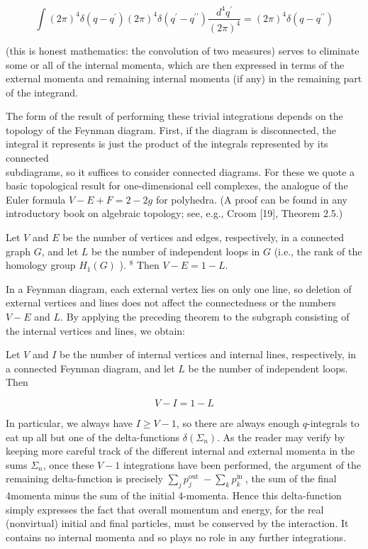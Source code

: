 \documentclass[10pt, letterpaper]{article}
\begin{document}
$$
\int(2 \pi)^{4} \delta\left(q-q^{\prime}\right)(2 \pi)^{4} \delta\left(q^{\prime}-q^{\prime \prime}\right) \frac{d^{4} q^{\prime}}{(2 \pi)^{4}}=(2 \pi)^{4} \delta\left(q-q^{\prime \prime}\right)
$$

(this is honest mathematics: the convolution of two measures) serves to eliminate some or all of the internal momenta, which are then expressed in terms of the external momenta and remaining internal momenta (if any) in the remaining part of the integrand.

The form of the result of performing these trivial integrations depends on the topology of the Feynman diagram. First, if the diagram is disconnected, the integral it represents is just the product of the integrals represented by its connected\\
subdiagrams, so it suffices to consider connected diagrams. For these we quote a basic topological result for one-dimensional cell complexes, the analogue of the Euler formula $V-E+F=2-2 g$ for polyhedra. (A proof can be found in any introductory book on algebraic topology; see, e.g., Croom [19], Theorem 2.5.)

Let $V$ and $E$ be the number of vertices and edges, respectively, in a connected graph $G$, and let $L$ be the number of independent loops in $G$ (i.e., the rank of the homology group $H_{1}(G)$ ). ${ }^{8}$ Then $V-E=1-L$.

In a Feynman diagram, each external vertex lies on only one line, so deletion of external vertices and lines does not affect the connectedness or the numbers $V-E$ and $L$. By applying the preceding theorem to the subgraph consisting of the internal vertices and lines, we obtain:

Let $V$ and $I$ be the number of internal vertices and internal lines, respectively, in a connected Feynman diagram, and let $L$ be the number of independent loops. Then

$$
V-I=1-L
$$

In particular, we always have $I \geq V-1$, so there are always enough $q$-integrals to eat up all but one of the delta-functions $\delta\left(\Sigma_{n}\right)$. As the reader may verify by keeping more careful track of the different internal and external momenta in the sums $\Sigma_{n}$, once these $V-1$ integrations have been performed, the argument of the remaining delta-function is precisely $\sum_{j} p_{j}^{\text {out }}-\sum_{k} p_{k}^{\text {in }}$, the sum of the final 4momenta minus the sum of the initial 4-momenta. Hence this delta-function simply expresses the fact that overall momentum and energy, for the real (nonvirtual) initial and final particles, must be conserved by the interaction. It contains no internal momenta and so plays no role in any further integrations.
\end{document}
